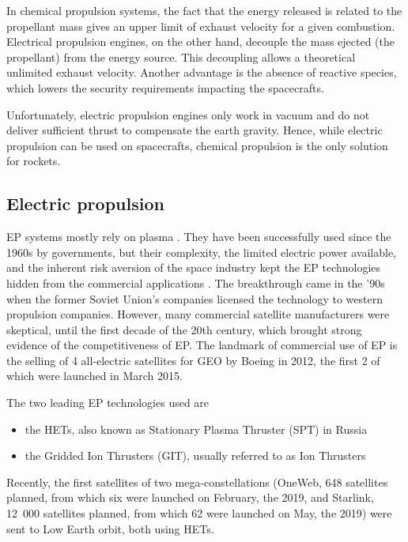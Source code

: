 In chemical propulsion systems, the fact that the energy released is related to the propellant mass gives an upper limit of exhaust velocity for a given combustion.
Electrical propulsion engines, on the other hand, decouple the mass ejected (the propellant) from the energy source.
This decoupling allows a theoretical unlimited exhaust velocity.
Another advantage is the absence of reactive species, which lowers the security requirements impacting the spacecrafts.

Unfortunately, electric propulsion engines only work in vacuum and do not deliver sufficient thrust to compensate the earth gravity.
Hence, while electric propulsion can be used on spacecrafts, chemical propulsion is the only solution for rockets.

\subsection*{Electric propulsion} \label{subsec-EP}
\ac{EP} systems mostly rely on plasma \citep{charles2009,mazouffre2016}.
They have been successfully used since the 1960s by governments, but their complexity, the limited electric power available, and the inherent risk aversion of the space industry kept the \ac{EP} technologies hidden from the commercial applications \citep{lev2019}.
The breakthrough came in the '90s when the former Soviet Union's companies licensed the technology to western propulsion companies.
However, many commercial satellite manufacturers were skeptical, until the first decade of the 20th century, which brought strong evidence of the competitiveness of \ac{EP}.
The landmark of commercial use of \ac{EP} is the selling of 4 all-electric satellites for \ac{GEO} by Boeing in 2012, the first 2 of which were launched in March 2015.

The two leading \ac{EP} technologies used are
\begin{itemize}
  \item the \ac{HET}s, also known as Stationary Plasma Thruster (SPT) in Russia
  \item the Gridded Ion Thrusters (GIT), usually referred to as Ion Thrusters
\end{itemize}

Recently, the first satellites of two mega-constellations (OneWeb, 648 satellites planned, from which six were launched on February, the  2019, and Starlink, 12~000 satellites planned, from which 62 were launched on May, the  2019) were sent to Low Earth orbit, both using \ac{HET}s. 


